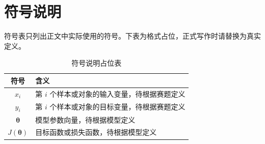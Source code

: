 \section{符号说明}

符号表只列出正文中实际使用的符号。下表为格式占位，正式写作时请替换为真实定义。

\begin{table}[H]
  \centering
  \caption{符号说明占位表}
  \begin{tabular}{cl}
    \toprule
    符号 & 含义 \\
    \midrule
    $x_i$ & 第 $i$ 个样本或对象的输入变量，待根据赛题定义 \\
    $y_i$ & 第 $i$ 个样本或对象的目标变量，待根据赛题定义 \\
    $\bm{\theta}$ & 模型参数向量，待根据模型定义 \\
    $J(\bm{\theta})$ & 目标函数或损失函数，待根据模型定义 \\
    \bottomrule
  \end{tabular}
\end{table}
